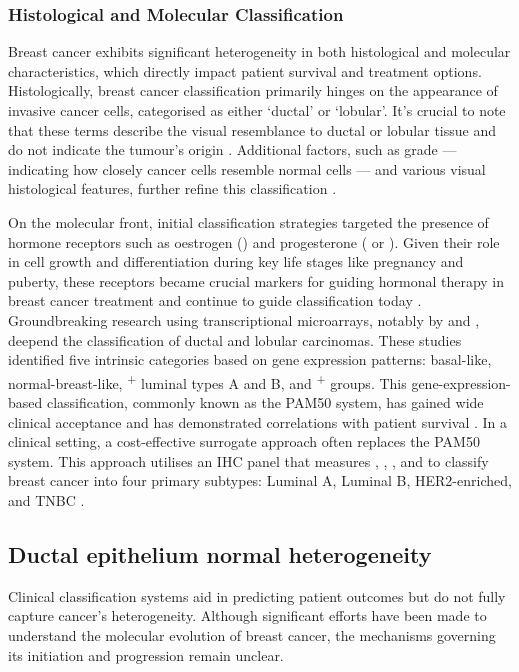 \subsubsection{Histological and Molecular Classification}
Breast cancer exhibits significant heterogeneity in both histological and molecular characteristics, which directly impact patient survival and treatment options. Histologically, breast cancer classification primarily hinges on the appearance of invasive cancer cells, categorised as either `ductal' or  `lobular'. It's crucial to note that these terms describe the visual resemblance to ductal or lobular tissue and do not indicate the tumour's origin  \parencite{Tabar2022-iq}. Additional factors, such as grade — indicating how closely cancer cells resemble normal cells — and various visual histological features, further refine this classification \parencite{Elston1991-md}.

On the molecular front, initial classification strategies targeted the presence of hormone receptors such as oestrogen () and progesterone ( or ). Given their role in cell growth and differentiation during key life stages like pregnancy and puberty, these receptors became crucial markers for guiding hormonal therapy in breast cancer treatment and continue to guide classification today \parencite{Early_breast_cancer_trialists_collaborative_group1992-dy}. Groundbreaking research using transcriptional microarrays, notably by \textcite{Perou2000-hc} and \textcite{Sorlie2001-yy}, deepend the classification of ductal and lobular carcinomas. These studies identified five intrinsic categories based on gene expression patterns: basal-like, normal-breast-like, \textsuperscript{+} luminal types A and B, and \textsuperscript{+} groups. This gene-expression-based classification, commonly known as the PAM50 system, has gained wide clinical acceptance and has demonstrated correlations with patient survival \parencite{Wallden2015-bp}. In a clinical setting, a cost-effective surrogate approach often replaces the PAM50 system. This approach utilises an \ac{IHC} panel that measures , , , and  to classify breast cancer into four primary subtypes: Luminal A, Luminal B, HER2-enriched, and \ac{TNBC} \parencite{Goldhirsch2013-xy}.

\subsection{Ductal epithelium normal heterogeneity}
Clinical classification systems aid in predicting patient outcomes but do not fully capture cancer's heterogeneity. Although significant efforts have been made to understand the molecular evolution of breast cancer, the mechanisms governing its initiation and progression remain unclear.

